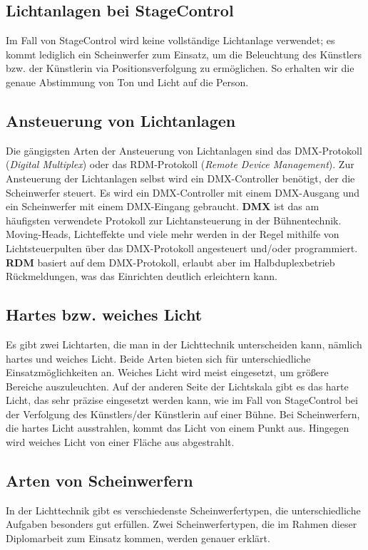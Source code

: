 \subsection{Lichtanlagen bei StageControl}
Im Fall von StageControl wird keine vollständige Lichtanlage verwendet; es kommt lediglich ein Scheinwerfer zum Einsatz, um die Beleuchtung des Künstlers bzw. der Künstlerin via Positionsverfolgung zu ermöglichen. So erhalten wir die genaue Abstimmung von Ton und Licht auf die Person.

\subsection{Ansteuerung von Lichtanlagen}

Die gängigsten Arten der Ansteuerung von Lichtanlagen sind das DMX-Protokoll (\emph{Digital Multiplex}) oder das RDM-Protokoll (\emph{Remote Device Management}). Zur Ansteuerung der Lichtanlagen selbst wird ein DMX-Controller benötigt, der die Scheinwerfer steuert. Es wird ein DMX-Controller mit einem DMX-Ausgang und ein Scheinwerfer mit einem DMX-Eingang gebraucht.
\textbf{DMX} ist das am häufigsten verwendete Protokoll zur Lichtansteuerung in der Bühnentechnik. Moving-Heads, Lichteffekte und viele mehr werden in der Regel mithilfe von Lichtsteuerpulten über das DMX-Protokoll angesteuert und/oder programmiert.
\textbf{RDM} basiert auf dem DMX-Protokoll, erlaubt aber im Halbduplexbetrieb Rückmeldungen, was das Einrichten deutlich erleichtern kann.\\
\textcite{LichtanlageRDMDMX}

\subsection{Hartes bzw. weiches Licht}
Es gibt zwei Lichtarten, die man in der Lichttechnik unterscheiden kann, nämlich hartes und weiches Licht. Beide Arten bieten sich für unterschiedliche Einsatzmöglichkeiten an. Weiches Licht wird meist eingesetzt, um größere Bereiche auszuleuchten. Auf der anderen Seite der Lichtskala gibt es das harte Licht, das sehr präzise eingesetzt werden kann, wie im Fall von StageControl bei der Verfolgung des Künstlers/der Künstlerin auf einer Bühne. Bei Scheinwerfern, die hartes Licht ausstrahlen, kommt das Licht von einem Punkt aus. Hingegen wird weiches Licht von einer Fläche aus abgestrahlt.\\
\textcite{HartesWeichesLicht}

\subsection{Arten von Scheinwerfern}
In der Lichttechnik gibt es verschiedenste Scheinwerfertypen, die unterschiedliche Aufgaben besonders gut erfüllen. Zwei Scheinwerfertypen, die im Rahmen dieser Diplomarbeit zum Einsatz kommen, werden genauer erklärt.

